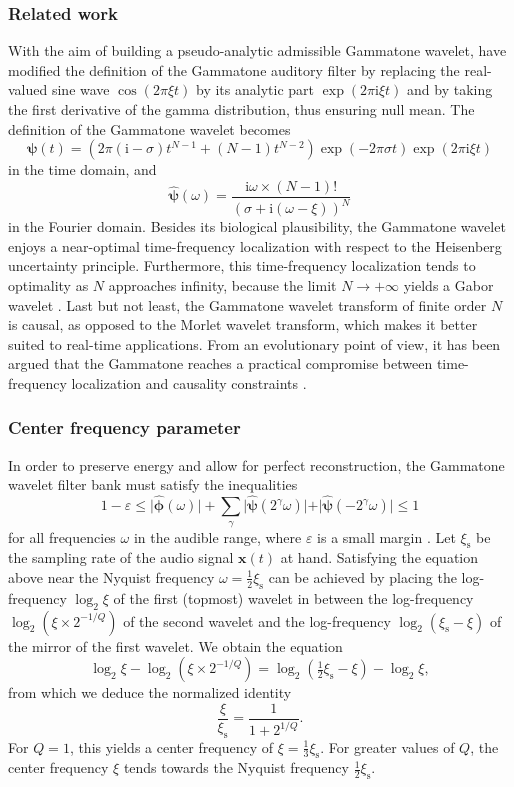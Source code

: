 \documentclass[smallextended]{svjour3}
\begin{document}
\subsubsection*{Related work}

With the aim of building a pseudo-analytic admissible Gammatone wavelet,
\cite{Venkitaraman2014} have modified the definition of the Gammatone
auditory filter by replacing the real-valued sine wave $\cos(2\pi \xi t)$
by its analytic part $\exp(2\pi\mathrm{\mathrm{i}}\xi t)$ and by taking
the first derivative of the gamma distribution, thus ensuring null
mean. The definition of the Gammatone wavelet becomes
\[
\boldsymbol{\psi}(t)=\left(2\pi(\mathrm{i}-\sigma)t^{N-1}+(N-1)t^{N-2}\right)\exp(-2\pi\sigma t)\exp(2\pi\mathrm{i}\xi t)
\]
in the time domain, and
\[
\boldsymbol{\widehat{\psi}}(\omega)=\dfrac{\mathrm{i}\omega\times(N-1)!}{(\sigma+\mathrm{i}(\omega-\xi))^{N}}
\]
in the Fourier domain. Besides its biological plausibility, the Gammatone
wavelet enjoys a near-optimal time-frequency localization with respect
to the Heisenberg uncertainty principle. Furthermore, this time-frequency
localization tends to optimality as $N$ approaches infinity, because
the limit $N\rightarrow+\infty$ yields a Gabor wavelet \cite{Cohen1995}.
Last but not least, the Gammatone wavelet transform of finite order
$N$ is causal, as opposed to the Morlet wavelet transform, which
makes it better suited to real-time applications. From an evolutionary
point of view, it has been argued that the Gammatone reaches a practical
compromise between time-frequency localization and causality constraints \cite{Venkitaraman2014}.


\subsubsection*{Center frequency parameter}

In order to preserve energy and allow for perfect reconstruction,
the Gammatone wavelet filter bank must satisfy the inequalities
\[
1-\varepsilon\leq\vert\boldsymbol{\hat{\phi}}(\omega)\vert+\sum_{\gamma}\vert\boldsymbol{\hat{\psi}}(2^{\gamma}\omega)\vert+\vert\boldsymbol{\hat{\psi}}(-2^{\gamma}\omega)\vert\leq1
\]
for all frequencies $\omega$ in the audible range, where $\varepsilon$ is a small margin
\cite{Anden2014}. 
Let $\xi_{\mathrm{s}}$ be the sampling rate of the audio signal $\boldsymbol{x}(t)$ at hand.
Satisfying the equation above near the Nyquist
frequency $\omega=\frac{1}{2}\xi_{\mathrm{s}}$ can be achieved by placing the log-frequency
$\log_{2}\xi$ of the first (topmost) wavelet in between the log-frequency
$\log_{2}(\xi\times2^{-1/Q})$ of the second wavelet and the log-frequency
$\log_{2}(\xi_{\mathrm{s}}-\xi)$ of the mirror of the first wavelet. We obtain
the equation
\[
\log_{2}\xi-\log_{2}(\xi\times2^{-1/Q})=\log_{2}(\tfrac{1}{2}\xi_{\mathrm{s}}-\xi)-\log_{2}\xi,
\]
from which we deduce the normalized identity
\[
\dfrac{\xi}{\xi_\mathrm{s}}=\dfrac{1}{1+2^{1/Q}}.
\]
For $Q=1$, this yields a center frequency of $\xi=\frac{1}{3}\xi_{\mathrm{s}}$.
For greater values of $Q$, the center frequency $\xi$ tends towards the Nyquist frequency $\frac{1}{2}\xi_{\mathrm{s}}$.
\end{document}
